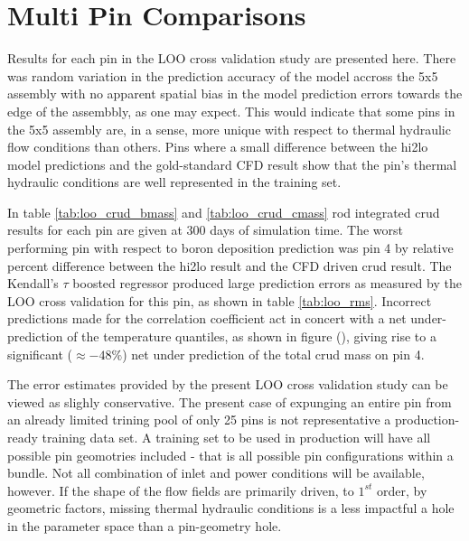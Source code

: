 \section{Multi Pin Comparisons}
\label{sec:multi_pin_result}

Results for each pin in the LOO cross validation study are presented here.  There was random variation in the prediction accuracy of the model accross the 5x5 assembly with no apparent spatial bias in the model prediction errors towards the edge of the assembbly, as one may expect.  This would indicate that some pins in the 5x5 assembly are, in a sense, more unique with respect to thermal hydraulic flow conditions than others.  Pins where a small difference between the hi2lo model predictions and the gold-standard CFD result show that the pin's thermal hydraulic conditions are well represented in the training set.

In table \ref{tab:loo_crud_bmass} and \ref{tab:loo_crud_cmass} rod integrated crud results for each pin are given at 300 days of simulation time.  The worst performing pin with respect to boron deposition prediction was pin 4 by relative percent difference between the hi2lo result and the CFD driven crud result.  The Kendall's $\tau$ boosted regressor produced large prediction errors as measured by the LOO cross validation for this pin, as shown in table \ref{tab:loo_rms}.  Incorrect predictions made for the correlation coefficient act in concert with a net under-prediction of the temperature quantiles, as shown in figure (), giving rise to a significant ($\approx -48\%$) net under prediction of the total crud mass on pin 4.

The error estimates provided by the present LOO cross validation study can be viewed as slighly conservative.  The present case of expunging an entire pin from an already limited trining pool of only 25 pins is not representative a production-ready training data set.  A training set to be used in production will have all possible pin geomotries included - that is all possible pin configurations within a bundle.  Not all combination of inlet and power conditions will be available, however.  If the shape of the flow fields are primarily driven, to $1^{st}$ order, by geometric factors, missing thermal hydraulic conditions is a less impactful a hole in the parameter space than a pin-geometry hole.

